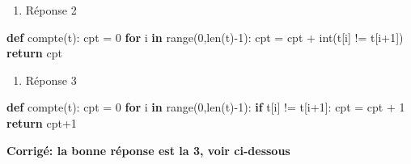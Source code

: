 \documentclass[11pt]{article}
\providecommand{\tightlist}{%
      \setlength{\itemsep}{0pt}\setlength{\parskip}{0pt}}
\newenvironment{Shaded}{}{}
\newcommand{\KeywordTok}[1]{\textcolor[rgb]{0.00,0.44,0.13}{\textbf{{#1}}}}
\newcommand{\DecValTok}[1]{\textcolor[rgb]{0.25,0.63,0.44}{{#1}}}
\newcommand{\NormalTok}[1]{{#1}}
\newcommand{\ControlFlowTok}[1]{\textcolor[rgb]{0.00,0.44,0.13}{\textbf{{#1}}}}
\newcommand{\OperatorTok}[1]{\textcolor[rgb]{0.40,0.40,0.40}{{#1}}}
\newcommand{\BuiltInTok}[1]{{#1}}
\begin{document}
\begin{enumerate}
\def\labelenumi{\arabic{enumi}.}
\setcounter{enumi}{1}
\tightlist
\item
  Réponse 2
\end{enumerate}

\begin{Shaded}
\begin{Highlighting}[]
    \KeywordTok{def}\NormalTok{ compte(t):}
\NormalTok{      cpt }\OperatorTok{=} \DecValTok{0}
      \ControlFlowTok{for}\NormalTok{ i }\KeywordTok{in} \BuiltInTok{range}\NormalTok{(}\DecValTok{0}\NormalTok{,}\BuiltInTok{len}\NormalTok{(t)}\OperatorTok{{-}}\DecValTok{1}\NormalTok{):}
\NormalTok{        cpt }\OperatorTok{=}\NormalTok{ cpt }\OperatorTok{+} \BuiltInTok{int}\NormalTok{(t[i] }\OperatorTok{!=}\NormalTok{ t[i}\OperatorTok{+}\DecValTok{1}\NormalTok{])}
      \ControlFlowTok{return}\NormalTok{ cpt}
\end{Highlighting}
\end{Shaded}

\begin{enumerate}
\def\labelenumi{\arabic{enumi}.}
\setcounter{enumi}{2}
\tightlist
\item
  Réponse 3
\end{enumerate}

\begin{Shaded}
\begin{Highlighting}[]
    \KeywordTok{def}\NormalTok{ compte(t):}
\NormalTok{      cpt }\OperatorTok{=} \DecValTok{0}
      \ControlFlowTok{for}\NormalTok{ i }\KeywordTok{in} \BuiltInTok{range}\NormalTok{(}\DecValTok{0}\NormalTok{,}\BuiltInTok{len}\NormalTok{(t)}\OperatorTok{{-}}\DecValTok{1}\NormalTok{):}
        \ControlFlowTok{if}\NormalTok{ t[i] }\OperatorTok{!=}\NormalTok{ t[i}\OperatorTok{+}\DecValTok{1}\NormalTok{]:}
\NormalTok{          cpt }\OperatorTok{=}\NormalTok{ cpt }\OperatorTok{+} \DecValTok{1}
      \ControlFlowTok{return}\NormalTok{ cpt}\OperatorTok{+}\DecValTok{1}
\end{Highlighting}
\end{Shaded}

    \textbf{Corrigé: la bonne réponse est la 3, voir ci-dessous}
\end{document}

